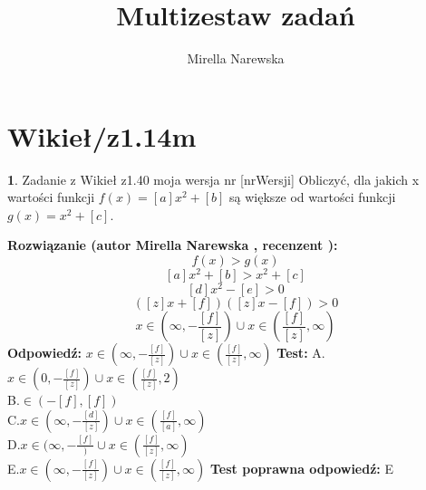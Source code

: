 \documentclass[12pt, a4paper]{article}
\title{Multizestaw zadań}
\author{Mirella Narewska}
\date{}
\theoremstyle{definition} %
\newtheorem{zad}{}
\newcommand{\kategoria}[1]{\section{#1}} %
\newcommand{\zadStart}[1]{\begin{zad}#1\newline} %
\newcommand{\zadStop}{\end{zad}}   %
\newcommand{\rozwStart}[2]{\noindent \textbf{Rozwiązanie (autor #1 , recenzent #2): }\newline} %
\newcommand{\rozwStop}{\newline}                                            %
\newcommand{\odpStart}{\noindent \textbf{Odpowiedź:}\newline}    %
\newcommand{\odpStop}{\newline}                                             %
\newcommand{\testStart}{\noindent \textbf{Test:}\newline} %
\newcommand{\testStop}{\newline} %
\newcommand{\kluczStart}{\noindent \textbf{Test poprawna odpowiedź:}\newline} %
\newcommand{\kluczStop}{\newline} %
\begin{document}
\maketitle


\kategoria{Wikieł/z1.14m}
\zadStart{Zadanie z Wikieł z1.40  moja wersja nr [nrWersji]}
Obliczyć, dla jakich x wartości funkcji $f(x) =[a]x^2 +[b]$ są większe od wartości funkcji $g(x)=x^2 + [c]$.
\zadStop
\rozwStart{Mirella Narewska}{}
$$$$
$$f(x)>g(x)$$
$$[a]x^2 + [b] >x^2 + [c]$$
$$[d]x^2 - [e] >0$$
$$([z]x + [f])([z]x - [f])>0$$
$$x \in(\infty ,-\frac{[f]}{[z]}) \cup x \in(\frac{[f]}{[z]},\infty) $$
\rozwStop
\odpStart
$x \in(\infty ,-\frac{[f]}{[z]}) \cup x \in(\frac{[f]}{[z]},\infty)$
\odpStop
\testStart
A.$x \in(0,-\frac{[f]}{[z]}) \cup x \in(\frac{[f]}{[z]},2)$
\\
B.$ \in(-[f],[f])$
\\
C.$x \in(\infty ,-\frac{[d]}{[z]}) \cup x \in(\frac{[f]}{[a]},\infty)$
\\
D.$x \in(\infty ,-\frac{[f]}) \cup x \in(\frac{[f]}{[z]},\infty)$
\\
E.$x \in(\infty ,-\frac{[f]}{[z]}) \cup x \in(\frac{[f]}{[z]},\infty)$
\testStop
\kluczStart
E
\kluczStop
\end{document}
